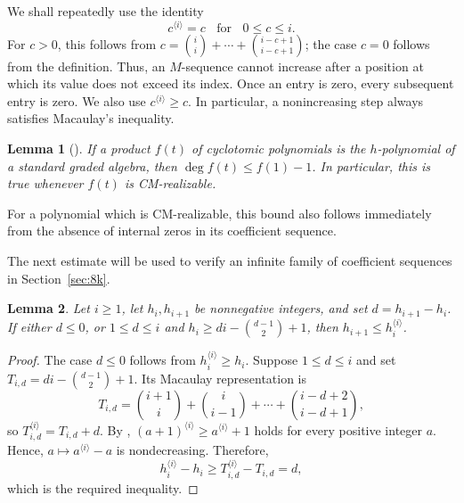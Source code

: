 \documentclass[11pt,a4paper]{amsart}
\newtheorem{lemma}[lemma]{Lemma}
\theoremstyle{definition}
\theoremstyle{remark}
\begin{document}
We shall repeatedly use the identity
\begin{equation}\label{eq:small-macaulay}
c^{\langle i\rangle}=c\;\;\text{ for }\;\; 0\le c\le i.
\end{equation}
For $c>0$, this follows from $c=\binom{i}{i}+\cdots+\binom{i-c+1}{i-c+1}$; the case $c=0$ follows from the definition. Thus, an $M$-sequence cannot increase after a position at which its value does not exceed its index. Once an entry is zero, every subsequent entry is zero. We also use $c^{\langle i\rangle}\ge c$. In particular, a nonincreasing step always satisfies Macaulay's inequality.

\begin{lemma}[{\cite[Proposition~3.2]{HigashitaniUeyama}}]\label{lem:degree-bound}
If a product $f(t)$ of cyclotomic polynomials is the $h$-polynomial of a standard graded algebra, then $\deg f(t)\le f(1)-1$. In particular, this is true whenever $f(t)$ is CM-realizable.
\end{lemma}
For a polynomial which is CM-realizable, this bound also follows immediately from the absence of internal zeros in its coefficient sequence.

The next estimate will be used to verify an infinite family of coefficient sequences in Section~\ref{sec:8k}.
\begin{lemma}\label{lem:macaulay-increment}
Let $i\ge1$, let $h_i,h_{i+1}$ be nonnegative integers, and set $d=h_{i+1}-h_i$. If either $d\le0$, or $1\le d\le i$ and $h_i\ge di-\binom{d-1}{2}+1$, then $h_{i+1}\le h_i^{\langle i\rangle}$.
\end{lemma}
\begin{proof}
The case $d\le0$ follows from $h_i^{\langle i\rangle}\ge h_i$. Suppose $1\le d\le i$ and set $T_{i,d}=di-\binom{d-1}{2}+1$. Its Macaulay representation is
\[T_{i,d}=\binom{i+1}{i}+\binom{i}{i-1}+\cdots+\binom{i-d+2}{i-d+1},\]
so $T_{i,d}^{\langle i\rangle}=T_{i,d}+d$. By \cite[Lemma~4.2.13(b)]{BrunsHerzog}, $(a+1)^{\langle i\rangle}\ge a^{\langle i\rangle}+1$ holds for every positive integer $a$. Hence, $a\mapsto a^{\langle i\rangle}-a$ is nondecreasing.
Therefore, \[h_i^{\langle i\rangle}-h_i\ge T_{i,d}^{\langle i\rangle}-T_{i,d}=d,\]
which is the required inequality.
\end{proof}
\end{document}
